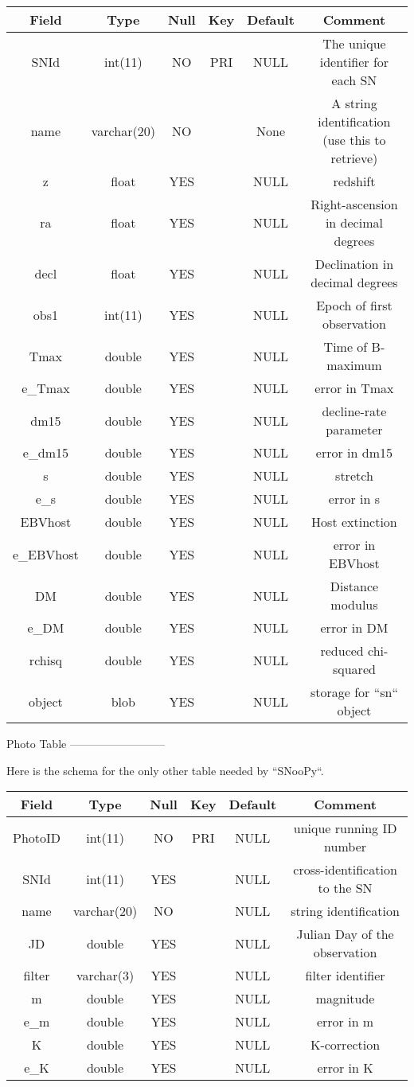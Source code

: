 \begin{tabular}{|c|c|c|c|c|c|}
\hline 
Field & Type & Null & Key & Default & Comment\tabularnewline
\hline 
\hline 
SNId & int(11) & NO & PRI & NULL & The unique identifier for each SN\tabularnewline
\hline 
name & varchar(20) & NO &  & None & A string identification (use this to retrieve)\tabularnewline
\hline 
z & float & YES &  & NULL & redshift\tabularnewline
\hline 
ra & float & YES &  & NULL & Right-ascension in decimal degrees\tabularnewline
\hline 
decl & float & YES &  & NULL & Declination in decimal degrees\tabularnewline
\hline 
obs1 & int(11) & YES &  & NULL & Epoch of first observation\tabularnewline
\hline 
Tmax & double & YES &  & NULL & Time of B-maximum\tabularnewline
\hline 
e_Tmax & double & YES &  & NULL & error in Tmax\tabularnewline
\hline 
dm15 & double & YES &  & NULL & decline-rate parameter\tabularnewline
\hline 
e_dm15 & double  & YES &  & NULL & error in dm15\tabularnewline
\hline 
s & double & YES &  & NULL & stretch\tabularnewline
\hline 
e_s & double & YES &  & NULL & error in s\tabularnewline
\hline 
EBVhost & double  & YES &  & NULL & Host extinction\tabularnewline
\hline 
e_EBVhost & double & YES &  & NULL & error in EBVhost\tabularnewline
\hline 
DM & double & YES &  & NULL & Distance modulus\tabularnewline
\hline 
e_DM & double & YES &  & NULL & error in DM\tabularnewline
\hline 
rchisq & double & YES &  & NULL & reduced chi-squared\tabularnewline
\hline 
object & blob & YES &  & NULL & storage for ``sn`` object\tabularnewline
\hline 
\end{tabular}


Photo Table
--------------------------

Here is the schema for the only other table needed by ``SNooPy``.

\begin{tabular}{|c|c|c|c|cc|}
\hline 
Field & Type & Null & Key & Default & Comment\tabularnewline
\hline 
\hline 
PhotoID & int(11) & NO & PRI & NULL & unique running ID number\tabularnewline
\hline 
SNId & int(11) & YES &  & NULL & cross-identification to the SN\tabularnewline
\hline 
name & varchar(20) & NO &  & NULL & string identification\tabularnewline
\hline 
JD & double & YES &  & NULL & Julian Day of the observation\tabularnewline
\hline 
filter & varchar(3) & YES &  & NULL & filter identifier\tabularnewline
\hline 
m & double & YES &  & NULL & magnitude\tabularnewline
\hline 
e_m & double & YES &  & NULL & error in m\tabularnewline
\hline 
K & double & YES &  & NULL & K-correction\tabularnewline
\hline 
e_K & double & YES &  & NULL & error in K\tabularnewline
\hline 
\end{tabular}


